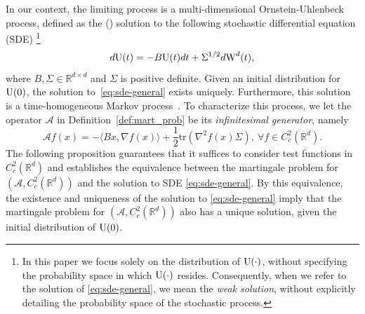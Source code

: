 \documentclass[11pt]{article}
\theoremstyle{plain}
\theoremstyle{definition}
\newcommand{\inner}[2]{\langle #1, #2 \rangle}
\def\ermW{{\textnormal{W}}}
\def\ermX{{\textnormal{X}}}
\def\x{{\boldsymbol{x}}}
\def\AM{{\mathcal A}}
\def\RB{{\mathbb R}}
\def\tr{\mathrm{tr}}
\newcommand{\uu}{{\textnormal{U}}}
\begin{document}
In our context, the limiting process is a multi-dimensional Ornstein-Uhlenbeck process, defined as the () solution to the following stochastic differential equation (SDE)
\footnote{In this paper we focus solely on the distribution of $\uu(\cdot)$, without specifying the probability space in which $\uu(\cdot)$ resides.
Consequently, when we refer to the solution of \eqref{eq:sde-general}, we mean the \textit{weak solution}, without explicitly detailing the probability space of the stochastic process.}
\begin{equation}\label{eq:sde-general}
	d \uu(t) = - B \uu(t) dt + \Sigma^{1/2} d \ermW^d(t),
\end{equation}
where $B, \Sigma \in \RB^{d \times d}$ and $\Sigma$ is positive definite.
Given an initial distribution for $\uu(0)$,
the solution to~\eqref{eq:sde-general} exists uniquely. Furthermore, this solution is a time-homogeneous Markov process~\citep[Chapter 5, Section 3]{ethier2009markov}.
To characterize this process, we let the operator $\AM$ in Definition~\ref{def:mart_prob} be its  \textit{infinitesimal generator}, namely
\begin{equation}\label{eq:generator-general}
    \AM f(x) = - \inner{Bx}{\nabla f(x)} + \frac{1}{2} \tr ( \nabla^2 f(x) \Sigma ), \ \forall f \in C^2_c(\RB^d).
\end{equation}
The following proposition guarantees that it suffices to consider test functions in $C_c^2(\RB^d)$ and establishes the equivalence between the martingale problem for $ (\AM, C_c^2(\RB^d))$ and the solution to  SDE \eqref{eq:sde-general}.
By this equivalence, the existence and uniqueness of the solution to \eqref{eq:sde-general} imply that the martingale problem for $(\AM, C_c^2(\RB^d))$ also has a unique solution, given the initial distribution of $\uu(0)$.
\end{document}
